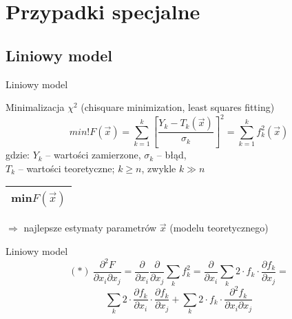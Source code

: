 \section{Przypadki specjalne}

\subsection{Liniowy model}
  \begin{frame}{Liniowy model}
    \begin{block}{Minimalizacja $\chi^{2}$ (chisquare minimization, least squares fitting)}
      \begin{displaymath}
        min!F(\vec{x}) = \sum_{k=1}^{k} \left[ \frac{Y_{k} - T_{k}(\vec{x})}{\sigma_{k}} \right]^{2} = \sum_{k=1}^{k} f_{k}^{2}(\vec{x})
      \end{displaymath}
      gdzie: $Y_{k}$ -- wartości zamierzone, $\sigma_{k}$ -- błąd,\\
      $T_{k}$ -- wartości teoretyczne; $k \geq n$, zwykle $k \gg n$ \\
      \begin{tabular}{|c|} \hline
        min$F(\vec{x})$ \\ \hline
      \end{tabular}
      $\Rightarrow$ najlepsze estymaty parametrów $\vec{x}$
      (modelu teoretycznego)
    \end{block}

  \end{frame}

  \begin{frame}{Liniowy model}
    \begin{displaymath}
      (*)\ \frac{\partial^2 F}{\partial x_{i} \partial x_{j}} =
      \frac{\partial}{\partial x_{i}} \frac{\partial}{\partial x_{j}}
      \sum_{k} f_{k}^2 = \frac{\partial}{\partial x_{i}}
      \sum_{k} 2 \cdot f_{k} \cdot \frac{\partial f_{k}}{\partial x_{j}} =
    \end{displaymath}
    \begin{displaymath}
      \sum_{k} 2 \cdot \frac{\partial f_{k}}{\partial x_{i}} \cdot
      \frac{\partial f_{k}}{\partial x_{j}} +
      \sum_{k} 2 \cdot f_{k} \cdot
      \frac{\partial^2 f_{k}}{\partial x_{i} \partial x_{j}}
    \end{displaymath}

  \end{frame}
